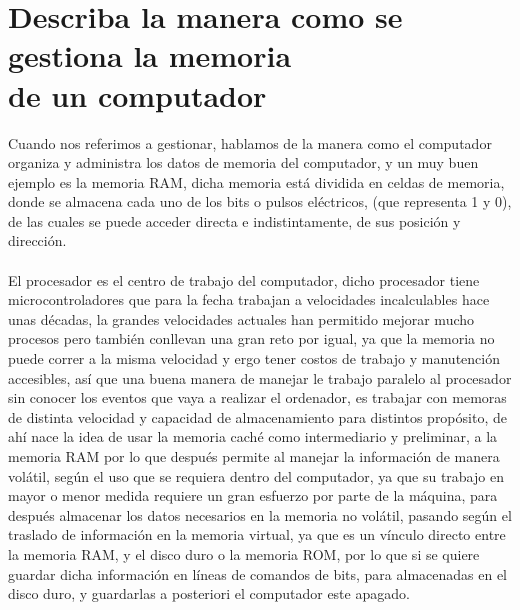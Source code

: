 \documentclass{article}
\begin{document}
	\section{Describa la manera como se gestiona la memoria\\de un computador} \label{describa}
	Cuando nos referimos a gestionar, hablamos de la manera como el computador organiza y administra los datos de memoria del computador, y un muy buen ejemplo es la memoria RAM, dicha memoria está dividida en celdas de memoria, donde se almacena cada uno de los bits o pulsos eléctricos, (que representa 1 y 0), de las cuales se puede acceder directa e indistintamente, de sus posición y dirección.
	\\\\
	El procesador es el centro de trabajo del computador, dicho procesador tiene microcontroladores que para la fecha trabajan a velocidades incalculables hace unas décadas, la grandes velocidades actuales han permitido mejorar mucho procesos pero también conllevan una gran reto por igual, ya que la memoria no puede correr a la misma velocidad y ergo tener costos de trabajo y manutención accesibles, así que una buena manera de manejar le trabajo paralelo al procesador sin conocer los eventos que vaya a realizar el ordenador, es trabajar con memoras de distinta velocidad y capacidad de almacenamiento para distintos propósito, de ahí nace la idea de usar la memoria caché como intermediario y preliminar, a la memoria RAM por lo que después permite al manejar la información de manera volátil, según el uso que se requiera dentro del computador, ya que su trabajo en mayor o menor medida requiere un gran esfuerzo por parte de la máquina, para después almacenar los datos necesarios en la memoria no volátil, pasando según el traslado de información en la memoria virtual, ya que es un vínculo directo entre la memoria RAM, y el disco duro o la memoria ROM, por lo que si se quiere guardar dicha información en líneas de comandos de bits, para almacenadas en el disco duro, y guardarlas a posteriori el computador este apagado.

	
\end{document}
